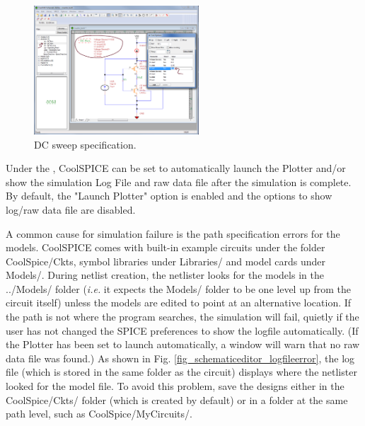 \begin{figure}
    \includegraphics[width=0.55\textwidth]{./figures/getting_started_figures/SchematicEditor_DCrunadded.png}
    \caption{{DC sweep specification.}}
  \label{fig_schematiceditor_analysistool}
\end{figure} 


%
Under the , {CoolSPICE} can be set to automatically launch the Plotter and/or show the simulation Log File and raw data file after the simulation is complete.  By default, the "Launch Plotter" option is enabled and the options to show log/raw data file are disabled. 

 A common cause for simulation failure is the path specification errors for the models.  CoolSPICE comes with built-in example circuits under the folder \textsf{CoolSpice/Ckts}, symbol libraries under \textsf{Libraries/} and model cards under \textsf{Models/}.  During netlist creation, the netlister looks for the models in the \textsf{../Models/} folder (\textit{i.e.} it expects the \textsf{Models/} folder to be one level up from the circuit itself) unless the models are edited to point at an alternative location.  If the path is not where the program searches, the simulation will fail, quietly if the user has not changed the SPICE preferences to show the logfile automatically.  (If the Plotter has been set to launch automatically, a window will warn that no raw data file was found.) As shown in Fig. \ref{fig_schematiceditor_logfileerror}, the log file (which is stored in the same folder as the circuit) displays where the netlister looked for the model file.  To avoid this problem, save the designs either in the \textsf{CoolSpice/Ckts/} folder (which is created by default) or in a folder at the same path level, such as \textsf{CoolSpice/MyCircuits/}. 

